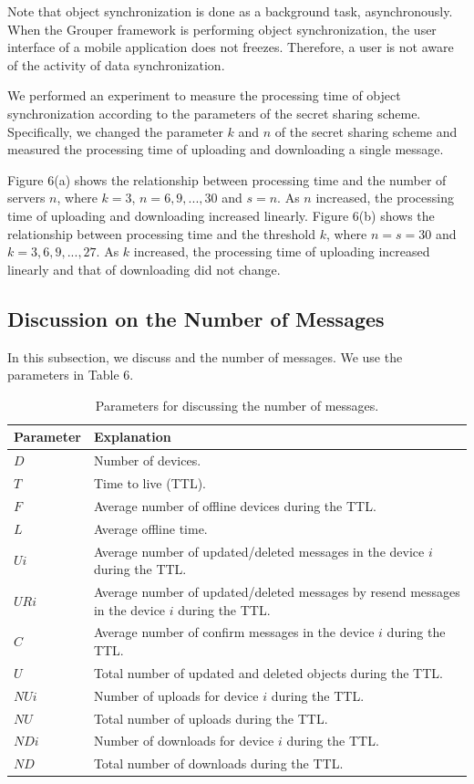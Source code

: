 \documentclass[sigconf]{acmart}
\begin{document}
Note that object synchronization is done as a background task, asynchronously.
When the Grouper framework is performing object synchronization, the user interface of a mobile application does not freezes.
Therefore, a user is not aware of the activity of data synchronization.

We performed an experiment to measure the processing time of object synchronization according to the parameters of the secret sharing scheme.
Specifically, we changed the parameter ${k}$ and ${n}$ of the secret sharing scheme and measured the processing time of uploading and downloading a single message.

Figure 6(a) shows the relationship between processing time and the number of servers ${n}$, where ${k=3}$,  ${n = 6, 9, ... , 30}$ and $s = n$.
As $n$ increased, the processing time of uploading and downloading increased linearly. 
Figure 6(b) shows the relationship between processing time and the threshold ${k}$, where ${n = s =30}$ and ${k = 3, 6, 9, ... , 27}$.
As $k$ increased, the processing time of uploading increased linearly and that of downloading did not change.

\subsection{Discussion on the Number of Messages}

In this subsection, we discuss and the number of messages. 
We use the parameters in Table 6.

\begin{table}[t]
	\centering
	\small
	\caption{Parameters for discussing the number of messages.}
	\begin{tabular}{ll}
		\hline
		\textbf{Parameter} & \textbf{Explanation} \\ \hline
		$D$ & Number of devices. \\
		$T$ & Time to live (TTL). \\
		$F$ & Average number of offline devices during the TTL. \\
		$L$ & Average offline time. \\
		$Ui$ & Average number of updated/deleted messages in the device $i$ during the TTL. \\ 
		$URi$ & Average number of updated/deleted messages by resend messages in the device $i$ during the TTL.\\ 
		$C$ & Average number of confirm messages in the device $i$ during the TTL. \\ 
		$U$ & Total number of updated and deleted objects during the TTL. \\ 
		$NUi$ & Number of uploads for device $i$ during the TTL. \\
		$NU$ & Total number of uploads during the TTL. \\
		$NDi$ & Number of downloads for device $i$ during the TTL. \\
		$ND$ & Total number of downloads during the TTL. \\ \hline
	\end{tabular}
\end{table}
\end{document}
